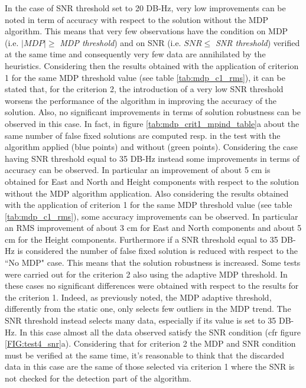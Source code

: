 In the case of SNR threshold set to 20 DB-Hz, very low improvements can be noted in term of accuracy with respect to the solution without the MDP algorithm. This means that very few observations have the condition on MDP (i.e. $|MDP| \geq$ \textit{MDP threshold}) and on SNR (i.e. $SNR \leq$ \textit{SNR threshold}) verified at the same time and consequently very few data are annihilated by the heuristics. Considering then the results obtained with the application of criterion 1 for the same MDP threshold value (see table \ref{tab:mdp_c1_rms}), it can be stated that, for the criterion 2, the introduction of a very low SNR threshold worsens the performance of the algorithm in improving the accuracy of the solution. Also, no significant improvements in terms of solution robustness can be observed in this case. 
In fact, in figure \ref{tab:mdp_crit1_mpind_table}a about the same number of false fixed solutions are computed resp. in the test with the algorithm applied (blue points) and  without (green points).
Considering the case having SNR threshold equal to 35 DB-Hz instead some improvements in terms of accuracy can be observed. In particular an improvement of about 5 cm is obtained for East and North and Height components with respect to the solution without the MDP algorithm application. Also considering the results obtained with the application of criterion 1 for the same MDP threshold value (see table \ref{tab:mdp_c1_rms}), some accuracy improvements can be observed. In particular an RMS improvement of about 3 cm for East and North components and about 5 cm for the Height components. Furthermore if a SNR threshold equal to 35 DB-Hz is considered the number of false fixed solution is reduced with respect to the ``No MDP" case. This means that the solution robustness is increased.
Some tests were carried out for the criterion 2 also using the adaptive MDP threshold. In these cases no significant differences were obtained with respect to the results for the criterion 1. Indeed, as previously noted, the MDP adaptive threshold, differently from the static one, only selects few outliers in the MDP trend. The SNR threshold instead selects many data, especially if its value is set to 35 DB-Hz. In this case almost all the data observed satisfy the SNR condition (cfr figure \ref{FIG:test4_snr}a). Considering that for criterion 2 the MDP and SNR condition must be verified at the same time, it's reasonable to think that the discarded  data in this case are the same of those selected via 
criterion 1 where the SNR is not checked for the detection part of the algorithm.

